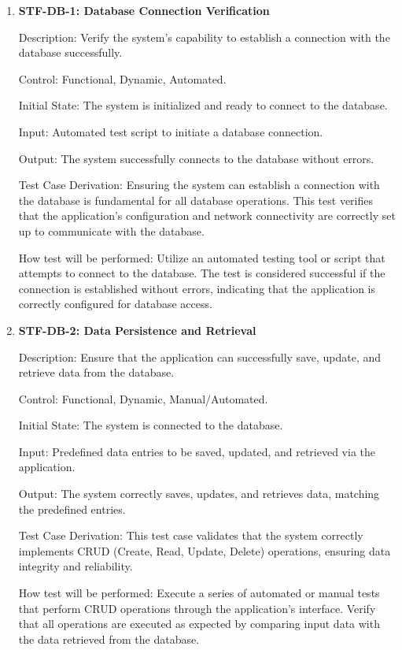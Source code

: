 \documentclass[12pt, titlepage]{article}
\begin{document}
\begin{enumerate}

    \item{\textbf{STF-DB-1: Database Connection Verification}\\}

    Description: Verify the system’s capability to establish a connection with the database successfully.

    Control: Functional, Dynamic, Automated.

    Initial State: The system is initialized and ready to connect to the database.

    Input: Automated test script to initiate a database connection.

    Output: The system successfully connects to the database without errors.

    Test Case Derivation: Ensuring the system can establish a connection with the database is fundamental for all database operations. This test verifies that the application's configuration and network connectivity are correctly set up to communicate with the database.

    How test will be performed: Utilize an automated testing tool or script that attempts to connect to the database. The test is considered successful if the connection is established without errors, indicating that the application is correctly configured for database access.

    \item{\textbf{STF-DB-2: Data Persistence and Retrieval}\\}

    Description: Ensure that the application can successfully save, update, and retrieve data from the database.

    Control: Functional, Dynamic, Manual/Automated.

    Initial State: The system is connected to the database.

    Input: Predefined data entries to be saved, updated, and retrieved via the application.

    Output: The system correctly saves, updates, and retrieves data, matching the predefined entries.

    Test Case Derivation: This test case validates that the system correctly implements CRUD (Create, Read, Update, Delete) operations, ensuring data integrity and reliability.

    How test will be performed: Execute a series of automated or manual tests that perform CRUD operations through the application's interface. Verify that all operations are executed as expected by comparing input data with the data retrieved from the database.

\end{enumerate}
\end{document}
